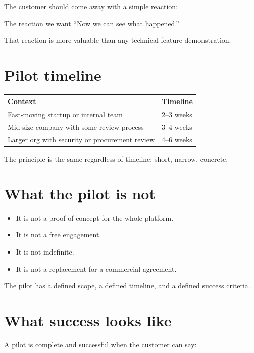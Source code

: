 The customer should come away with a simple reaction:

\begin{insightbox}{The reaction we want}
\centering
\large ``Now we can see what happened.''
\end{insightbox}

That reaction is more valuable than any technical feature demonstration.

\section{Pilot timeline}

\begin{center}
\renewcommand{\arraystretch}{1.5}
\begin{tabularx}{0.88\textwidth}{@{}lX@{}}
\toprule
\textbf{Context} & \textbf{Timeline} \\
\midrule
Fast-moving startup or internal team & 2--3 weeks \\
Mid-size company with some review process & 3--4 weeks \\
Larger org with security or procurement review & 4--6 weeks \\
\bottomrule
\end{tabularx}
\end{center}

The principle is the same regardless of timeline: short, narrow, concrete.

\section{What the pilot is not}

\begin{itemize}
  \item It is not a proof of concept for the whole platform.
  \item It is not a free engagement.
  \item It is not indefinite.
  \item It is not a replacement for a commercial agreement.
\end{itemize}

The pilot has a defined scope, a defined timeline, and a defined success criteria.

\section{What success looks like}

A pilot is complete and successful when the customer can say:

